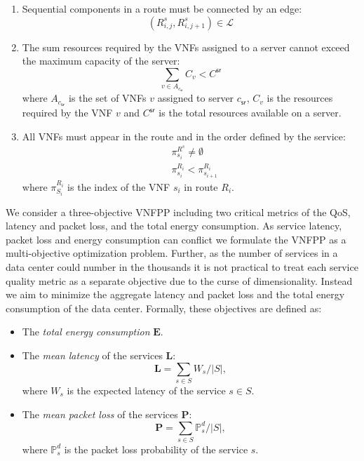 \begin{enumerate}
	\item Sequential components in a route must be connected by an edge:
		\begin{equation}
			(R_{i,j}^s, R_{i,j+1}^s) \in \mathcal{L}
		\end{equation}
    \item The sum resources required by the VNFs assigned to a server cannot exceed the maximum capacity of the server:
		\begin{equation}
			\sum_{v \in A_{c_\mathsf{sr}}} C_v < C^{\mathsf{sr}}
        \end{equation}
		where $A_{c_\mathsf{sr}}$ is the set of VNFs $v$ assigned to server $c_\mathsf{sr}$, $C_v$ is the resources required by the VNF $v$ and $C^{\mathsf{sr}}$ is the total resources available on a server.
	\item All VNFs must appear in the route and in the order defined by the service:
		\begin{align}
			& \pi^{R^s}_{s_i} \neq \emptyset \\
			& \pi^{R_i}_{s_i} < \pi^{R_i}_{s_{i+1}} 
		\end{align}
		where $\pi^{R_i}_{S_i}$ is the index of the VNF $s_i$ in route $R_i$.
\end{enumerate}

We consider a three-objective VNFPP including two critical metrics of the QoS, latency and packet loss, and the total energy consumption. As service latency, packet loss and energy consumption can conflict \cite{BillingsleyLMMG22} we formulate the VNFPP as a multi-objective optimization problem. Further, as the number of services in a data center could number in the thousands it is not practical to treat each service quality metric as a separate objective due to the curse of dimensionality. Instead we aim to minimize the aggregate latency and packet loss and the total energy consumption of the data center. Formally, these objectives are defined as:

\begin{itemize}
	\item The \textit{total energy consumption} $\mathbf{E}$.
    \item The \textit{mean latency} of the services $\mathbf{L}$:
        \begin{equation}
            \mathbf{L}=\sum_{s \in S} W_{s}/|S|,
        \end{equation}
        where $W_s$ is the expected latency of the service $s\in S$. 
    \item The \textit{mean packet loss} of the services $\mathbf{P}$:
        \begin{equation}
            \mathbf{P}=\sum_{s \in S} \mathbb{P}^d_s / |S|,
        \end{equation}
        where $\mathbb{P}^d_s$ is the packet loss probability of the service $s$.
\end{itemize}

